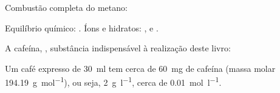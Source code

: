 \documentclass[12pt, a4paper]{article}
\begin{document}
\pagestyle{empty}

Combustão completa do metano:
\begin{center}
\end{center}
Equilíbrio químico: .
Íons e hidratos: ,  e .

A cafeína, , substância indispensável à realização deste livro:
\begin{center}
\end{center}

Um café expresso de \qty{30}{\milli\litre} tem cerca de \qty{60}{\milli\gram}
de cafeína (massa molar \qty{194,19}{\gram\per\mole}), ou seja,
\qty{2}{\gram\per\litre}, cerca de \qty{0,01}{\mole\per\litre}.
\end{document}
